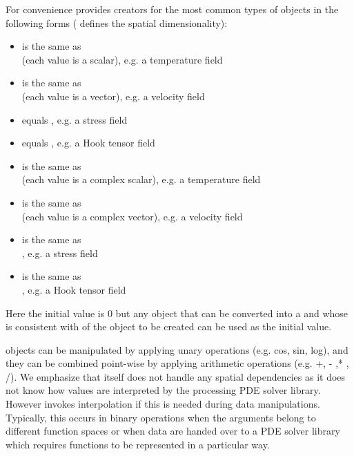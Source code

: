 For convenience \escript provides creators for the most common types
of \Data objects in the following forms ( defines the spatial
dimensionality):
\begin{itemize}
\item {} is the same as \\
    (each value is a scalar), e.g. a temperature field
\item {} is the same as \\
    (each value is a vector), e.g. a velocity field
\item {} equals ,
    e.g. a stress field
\item {} equals ,
    e.g. a Hook tensor field
\item {} is the same as \\
    (each value is a complex scalar), e.g. a temperature field
\item {} is the same as \\
    (each value is a complex vector), e.g. a velocity field
\item {} is the same as \\
, e.g. a stress field
\item {} is the same as \\
, e.g. a Hook tensor field
\end{itemize}
Here the initial value is 0 but any object that can be converted into
a \numpyNDA and whose \Shape is consistent with \Shape of the \Data object to
be created can be used as the initial value.

\Data objects can be manipulated by applying unary operations (e.g. cos, sin,
log), and they can be combined point-wise by applying arithmetic operations
(e.g. +, - ,* , /).
We emphasize that \escript itself does not handle any spatial dependencies as
it does not know how values are interpreted by the processing PDE solver library.
However \escript invokes interpolation if this is needed during data manipulations.
Typically, this occurs in binary operations when the arguments belong to
different function spaces or when data are handed over to a PDE solver library
which requires functions to be represented in a particular way.

